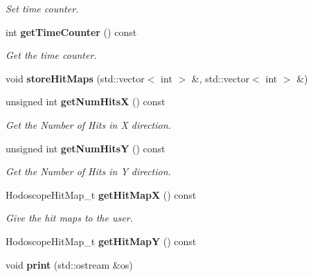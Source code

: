 \begin{DoxyCompactItemize}
\begin{DoxyCompactList}\small\item\em Set time counter. \item\end{DoxyCompactList}\item 
int {\bf getTimeCounter} () const \label{classCALICE_1_1HodoscopeEventDataBlock_a50fb6763875658f8b91a186ec470a2da}

\begin{DoxyCompactList}\small\item\em Get the time counter. \item\end{DoxyCompactList}\item 
void {\bfseries storeHitMaps} (std::vector$<$ int $>$ \&, std::vector$<$ int $>$ \&)\label{classCALICE_1_1HodoscopeEventDataBlock_af6847f3dc217a31f37d5e0a3be862248}

\item 
unsigned int {\bf getNumHitsX} () const \label{classCALICE_1_1HodoscopeEventDataBlock_a854a79d6e112dc7153809afbcb71e40c}

\begin{DoxyCompactList}\small\item\em Get the Number of Hits in X direction. \item\end{DoxyCompactList}\item 
unsigned int {\bf getNumHitsY} () const \label{classCALICE_1_1HodoscopeEventDataBlock_ae70c4a92cef77cc73726cd40ead186d3}

\begin{DoxyCompactList}\small\item\em Get the Number of Hits in Y direction. \item\end{DoxyCompactList}\item 
HodoscopeHitMap\_\-t {\bf getHitMapX} () const \label{classCALICE_1_1HodoscopeEventDataBlock_a56ff52ae20c90600f4268e2a9ec11015}

\begin{DoxyCompactList}\small\item\em Give the hit maps to the user. \item\end{DoxyCompactList}\item 
HodoscopeHitMap\_\-t {\bfseries getHitMapY} () const \label{classCALICE_1_1HodoscopeEventDataBlock_a536eb4acf8bebaa40022d7cc874779ee}

\item 
void {\bf print} (std::ostream \&os)\label{classCALICE_1_1HodoscopeEventDataBlock_aaeb17542763207334de0346c9c02f8c8}


\end{DoxyCompactItemize}
